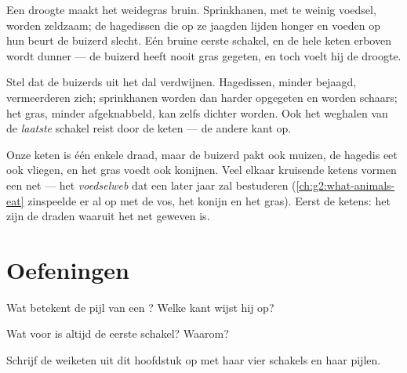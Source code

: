 \begin{example}\label{ex:g3:food-chains:dry}
Een droogte maakt het weidegras bruin. Sprinkhanen, met te weinig
voedsel, worden zeldzaam; de hagedissen die op ze jaagden lijden honger
en voeden op hun beurt de buizerd slecht. Eén bruine eerste schakel, en
de hele keten erboven wordt dunner --- de buizerd heeft nooit gras
gegeten, en toch voelt hij de droogte.
\end{example}

\begin{example}\label{ex:g3:food-chains:hunter}
Stel dat de buizerds uit het dal verdwijnen. Hagedissen, minder
bejaagd, vermeerderen zich; sprinkhanen worden dan harder opgegeten en
worden schaars; het gras, minder afgeknabbeld, kan zelfs dichter
worden. Ook het weghalen van de \emph{laatste} schakel reist door de
keten --- de andere kant op.
\end{example}

\begin{remark}\label{rem:g3:food-chains:web}
Onze keten is één enkele draad, maar de buizerd pakt ook muizen, de
hagedis eet ook vliegen, en het gras voedt ook konijnen. Veel elkaar
kruisende ketens vormen een net --- het \emph{voedselweb} dat een later
jaar zal bestuderen (\cref{ch:g2:what-animals-eat} zinspeelde er al op
met de vos, het konijn en het gras). Eerst de ketens: het zijn de
draden waaruit het net geweven is.
\end{remark}

\section{Oefeningen}

\begin{exercise}[$\star$]\label{exo:g3:food-chains:1}
Wat betekent de pijl van een ? Welke kant wijst hij op?
\end{exercise}

\begin{exercise}[$\star$]\label{exo:g3:food-chains:2}
Wat voor  is altijd de eerste schakel? Waarom?
\end{exercise}

\begin{exercise}[$\star$]\label{exo:g3:food-chains:3}
Schrijf de weiketen uit dit hoofdstuk op met haar vier schakels en haar
pijlen.
\end{exercise}

